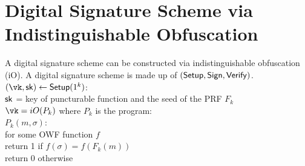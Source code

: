 \newcommand\rextlinearrow[2]{$
  \setbox0\hbox{$\extlines{#2}\rextlineend$}%
  \tiny$%
  \!\!\!\!\begin{array}{c}%
  \mathrm{#1}\\%
  \usebox0%
  \end{array}%
  $\normalsize$\!\!%
}

\newcommand\lextlinearrow[2]{$
  \setbox0\hbox{$\lextlineend\extlines{#2}$}%
  \tiny%
  $%
  \!\!\!\!\begin{array}{c}%
  \mathrm{#1}\\%
  \usebox0%
  \end{array}%
  $\normalsize$\!\!%
}

\renewcommand\lextlinearrow[2]{%
}

\renewcommand\rextlinearrow[2]{%
}
\renewcommand\lextlinearrow[2]{%
   $\stackrel{\mathrm{#1}}{\leftarrow}$%
}

\renewcommand\rextlinearrow[2]{%
  $\stackrel{\mathrm{#1}}{\rightarrow}$%
}



\section{Digital Signature Scheme via Indistinguishable Obfuscation}
A digital signature scheme can be constructed via indistinguishable obfuscation (iO).  A digital signature scheme is made up of $(\mathsf{Setup}, \mathsf{Sign}, \mathsf{Verify})$.\\


\noindent $(\vk, \sk) \leftarrow \SETUP(1^k)$:\\
\indent $\mathsf{sk}$ = key of puncturable function and the seed of the PRF $F_k$\\
\indent $\vk = iO(P_k)$ where $P_k$ is the program:\\
\indent \indent $P_k(m, \sigma)$:\\
\indent \indent \indent for some OWF function $f$\\
\indent \indent \indent \indent return 1 if $f(\sigma) = f(F_k(m))$\\
\indent \indent \indent \indent return 0 otherwise\\

